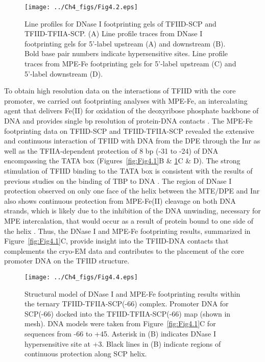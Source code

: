 \begin{figure}
\centering
\texttt{[image: ../Ch4\_figs/Fig4.2.eps]}
\caption[Line profiles for DNase I footprinting gels of TFIID-SCP and TFIID-TFIIA-SCP]{Line profiles for DNase I footprinting gels of TFIID-SCP and TFIID-TFIIA-SCP. (A) Line profile traces from DNase I footprinting gels for 5’-label upstream (A) and downstream (B). Bold base pair numbers indicate hypersensitive sites. Line profile traces from MPE-Fe footprinting gels for 5’-label upstream (C) and 5’-label downstream (D).}
\label{fig:Fig4.2}
\end{figure}
\indent To obtain high resolution data on the interactions of TFIID with the core promoter, we carried out footprinting analyses with MPE-Fe, an intercalating agent that delivers Fe(II) for oxidation of the deoxyribose phosphate backbone of DNA and provides single bp resolution of protein-DNA contacts \cite{Hertzberg_3897,Papavassiliou_3156,Va_3928}. The MPE-Fe footprinting data on TFIID-SCP and TFIID-TFIIA-SCP revealed the extensive and continuous interaction of TFIID with DNA from the DPE through the Inr as well as the TFIIA-dependent protection of 8 bp (-31 to -24) of DNA encompassing the TATA box (Figures~\ref{fig:Fig4.1}B \& \ref{fig:Fig4.2}C \& D). The strong stimulation of TFIID binding to the TATA box is consistent with the results of previous studies on the binding of TBP to DNA \cite{Geiger_2949,Kim_3416,Kim_3377,Nikolov_3177}. The region of DNase I protection observed on only one face of the helix between the MTE/DPE and Inr also shows continuous protection from MPE-Fe(II) cleavage on both DNA strands, which is likely due to the inhibition of the DNA unwinding, necessary for MPE intercalation, that would occur as a result of protein bound to one side of the helix \cite{Uchida_3659}. Thus, the DNase I and MPE-Fe footprinting results, summarized in Figure~\ref{fig:Fig4.1}C, provide insight into the TFIID-DNA contacts that complements the cryo-EM data and contributes to the placement of the core promoter DNA on the TFIID structure. \\
\begin{figure}
\centering
\texttt{[image: ../Ch4\_figs/Fig4.4.eps]}
\caption[Structural model of DNase I and MPE-Fe footprinting results within the ternary TFIID-TFIIA-SCP(-66) complex]{Structural model of DNase I and MPE-Fe footprinting results within the ternary TFIID-TFIIA-SCP(-66) complex. Promoter DNA for SCP(-66) docked into the TFIID-TFIIA-SCP(-66) map (shown in mesh). DNA models were taken from Figure~\ref{fig:Fig4.1}C for sequences from -66 to +45. Asterisk in (B) indicates DNase I hypersensitive site at +3. Black lines in (B) indicate regions of continuous protection along SCP helix. }
\label{fig:Fig4.4}
\end{figure}
